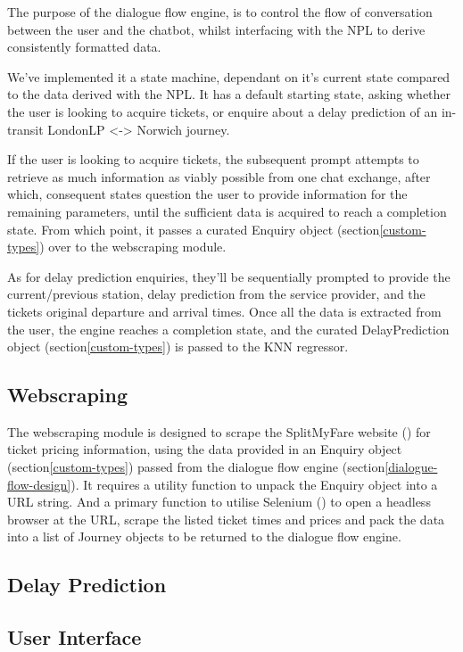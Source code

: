 \documentclass[11pt]{article}
\begin{document}
The purpose of the dialogue flow engine, is to control the flow of conversation between the user and the chatbot, whilst interfacing with the NPL to derive consistently formatted data.

We've implemented it a state machine, dependant on it's current state compared to the data derived with the NPL. It has a default starting state, asking whether the user is looking to acquire tickets, or enquire about a delay prediction of an in-transit LondonLP <-> Norwich journey.

If the user is looking to acquire tickets, the subsequent prompt attempts to retrieve as much information as viably possible from one chat exchange, after which, consequent states question the user to provide information for the remaining parameters, until the sufficient data is acquired to reach a completion state. From which point, it passes a curated Enquiry object (section\ref{custom-types}) over to the webscraping module.

As for delay prediction enquiries, they'll be sequentially prompted to provide the current/previous station, delay prediction from the service provider, and the tickets original departure and arrival times. Once all the data is extracted from the user, the engine reaches a completion state, and the curated DelayPrediction object (section\ref{custom-types}) is passed to the KNN regressor.

\subsection{Webscraping} \label{webscraping-design}

The webscraping module is designed to scrape the SplitMyFare website (\cite{splitmyfare}) for ticket pricing information, using the data provided in an Enquiry object (section\ref{custom-types}) passed from the dialogue flow engine (section\ref{dialogue-flow-design}). It requires a utility function to unpack the Enquiry object into a URL string. And a primary function to utilise Selenium (\cite{selenium}) to open a headless browser at the URL, scrape the listed ticket times and prices and pack the data into a list of Journey objects to be returned to the dialogue flow engine.

\subsection{Delay Prediction} \label{delay-prediction-design}


\subsection{User Interface} \label{user-interface-design}
\end{document}
